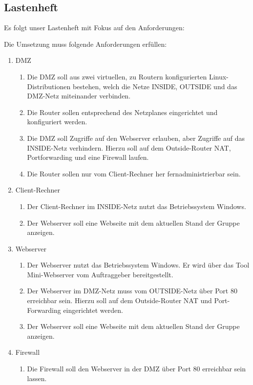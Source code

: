 \subsection{Lastenheft}
\label{app:Lastenheft}
Es folgt unser Lastenheft mit Fokus auf den Anforderungen:

Die Umsetzung muss folgende Anforderungen erfüllen: 
\begin{enumerate}[itemsep=0em,partopsep=0em,parsep=0em,topsep=0em]
\item DMZ
	\begin{enumerate}
	\item Die DMZ soll aus zwei virtuellen, zu Routern konfigurierten Linux-Distributionen bestehen, welch die Netze INSIDE, OUTSIDE und das DMZ-Netz miteinander verbinden. 
	\item Die Router sollen entsprechend des Netzplanes eingerichtet und konfiguriert werden.
	\item Die DMZ soll Zugriffe auf den Webserver erlauben, aber Zugriffe auf das INSIDE-Netz verhindern. Hierzu soll auf dem Outside-Router NAT, Portforwarding und eine Firewall laufen.
    \item Die Router sollen nur vom Client-Rechner her fernadministrierbar sein.
	\end{enumerate}
\item Client-Rechner
\begin{enumerate}
    \item Der Client-Rechner im INSIDE-Netz nutzt das Betriebssystem Windows.
    \item Der Webserver soll eine Webseite mit dem aktuellen Stand der Gruppe anzeigen.    
\end{enumerate}
\item Webserver
\begin{enumerate}
    \item Der Webserver nutzt das Betriebssystem Windows. Er wird über das Tool Mini-Webserver vom Auftraggeber bereitgestellt.
    \item Der Webserver im DMZ-Netz muss vom OUTSIDE-Netz über Port 80 erreichbar sein. Hierzu soll auf dem Outside-Router NAT und Port-Forwarding eingerichtet werden.
    \item Der Webserver soll eine Webseite mit dem aktuellen Stand der Gruppe anzeigen.    
\end{enumerate}
\item Firewall
\begin{enumerate}
    \item Die Firewall soll den Webserver in der DMZ über Port 80 erreichbar sein lassen.

\end{enumerate}
\end{enumerate}
